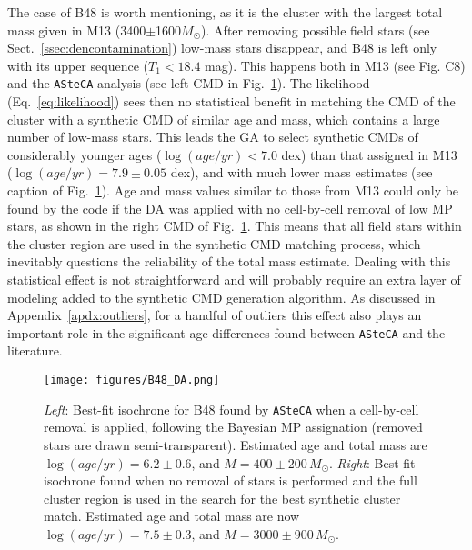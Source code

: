 \documentclass{aa}
\begin{document}
The case of B48 is worth mentioning, as it is the cluster with the largest total
mass given in M13 (3400$\pm$1600$M_{\odot}$).
After removing possible field stars (see Sect.~\ref{ssec:dencontamination})
low-mass stars disappear, and B48 is left only with its upper sequence 
($T_1<18.4$ mag). This happens both in M13 (see Fig. C8) and the
\texttt{ASteCA} analysis (see left CMD in Fig.~\ref{fig:B48_DA}).
%
The likelihood (Eq.~\ref{eq:likelihood}) sees then no statistical benefit in
matching the CMD of the cluster with a synthetic CMD of similar age and mass,
which contains a large number of low-mass stars.
This leads the GA to select synthetic CMDs of considerably younger ages
($\log(age/yr){<}7.0$ dex) than that assigned in M13
($\log(age/yr){=}7.9\pm0.05$ dex), and with much lower mass estimates (see
caption of Fig.~\ref{fig:B48_DA}).
%
%
Age and mass values similar to those from M13 could  only be found by the code
if the DA was applied with no cell-by-cell removal of low MP stars, as shown in
the right CMD of Fig.~\ref{fig:B48_DA}. This means that all field stars within
the cluster region are used in the synthetic CMD matching process, which
inevitably questions the reliability of the total mass estimate.
%
Dealing with this statistical effect is not straightforward and will probably
require an extra layer of modeling added to the synthetic CMD generation
algorithm.
As discussed in Appendix~\ref{apdx:outliers}, for a handful of outliers this
effect also plays an important role in the significant age differences found
between \texttt{ASteCA}
and the literature.

\begin{figure}
\centering
\texttt{[image: figures/B48\_DA.png]}
\caption{\emph{Left}: Best-fit isochrone for B48 found by \texttt{ASteCA} when
a cell-by-cell removal is applied, following the Bayesian MP assignation 
(removed stars are drawn semi-transparent). Estimated age and
total mass are $\log(age/yr){=}6.2{\pm}0.6$, and $M{=}400{\pm}200\,M_{\odot}$.
\emph{Right}: Best-fit isochrone found when no removal of stars is performed
and the full cluster region is used in the search for the best synthetic
cluster match. Estimated age and total mass are now
$\log(age/yr){=}7.5{\pm}0.3$, and $M{=}3000{\pm}900\,M_{\odot}$.}
\label{fig:B48_DA}
\end{figure}
\end{document}
